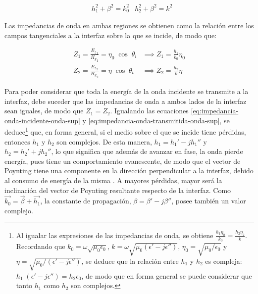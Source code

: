 \begin{align}
	\label{eq:condicion-componentes-normales-ondas-superficie}
	& h_1^2 + \beta^2 = k_0^2 &h_2^2 + \beta^2 = k^2
\end{align}

Las impedancias de onda en ambas regiones se obtienen como la relación entre los campos tangenciales a la interfaz sobre la que se incide, de modo que:

\begin{subequations}
\label{eq:impedancia-onda-superficie}
\begin{align}
	Z_1 = \frac{{E_z}_1}{{H_y}_1} = \eta_0 \; \cos\; \theta_i &\implies Z_1 = \frac{h_1}{k_0} \eta_0 \label{eq:impedancia-onda-incidente-onda-sup}\\
	Z_2 = \frac{{E_z}_2}{{H_y}_2} = \eta \; \cos \; \theta_t &\implies Z_2 = \frac{h_2}{k} \eta \label{eq:impedancia-onda-transmitida-onda-sup}
\end{align}
\end{subequations}

Para poder considerar que toda la energía de la onda incidente se transmite a la interfaz, debe suceder que las impedancias de onda a ambos lados de la interfaz sean iguales, de modo que $Z_1 = Z_2$. Igualando las ecuaciones \ref{eq:impedancia-onda-incidente-onda-sup} y \ref{eq:impedancia-onda-transmitida-onda-sup}, se deduce\footnote{Al igualar las expresiones de las impedancias de onda, se obtiene $\frac{h_1 \eta_0}{k_0} = \frac{h_2 \eta_2}{k}$. Recordando que $k_0=\omega \sqrt{\mu_0 \epsilon_0}$, $k=\omega \sqrt{\mu_0 (\epsilon'-j\epsilon'')}$, $\eta_0 = \sqrt{\mu_0 / \epsilon_0}$ y $\eta = \sqrt{\mu_0 / (\epsilon'-j\epsilon'')}$, se deduce que la relación entre $h_1$ y $h_2$ es compleja: $h_1\; (\epsilon' - j \epsilon'') = h_2 \epsilon_0$, de modo que en forma general se puede considerar que tanto $h_1$ como $h_2$ son complejos.} que, en forma general, si el medio sobre el que se incide tiene pérdidas, entonces $h_1$ y $h_2$ son complejos. De esta manera, $h_1 = h_1' - jh_1''$ y $h_2 = h_2' + jh_2''$, lo que significa que además de avanzar en fase, la onda pierde energía, pues tiene un comportamiento evanescente, de modo que el vector de Poynting tiene una componente en la dirección perpendicular a la interfaz, debido al consumo de energía de la misma \cite{Barlow:SurfaceWaves}. A mayores pérdidas, mayor será la inclinación del vector de Poynting resultante respecto de la interfaz. Como $\vec{k_0} = \vec{\beta} + \vec{h_1}$, la constante de propagación, $\beta = \beta' - j \beta''$, posee también un valor complejo.

